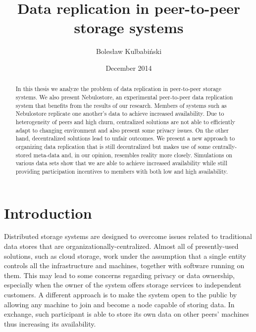 \documentclass{pracamgren}
\author{Bolesław Kulbabiński}
\title{Data replication in peer-to-peer storage systems}
\date{December 2014}
\begin{document}
 \maketitle

\begin{abstract} 
In this thesis we analyze the problem of data replication in peer-to-peer storage systems.
We also present Nebulostore, an experimental peer-to-peer data replication system that benefits from the results of our research.
Members of systems such as Nebulostore replicate one another's data to achieve increased availability. Due to heterogeneity of peers and high churn, centralized solutions are not able to efficiently adapt to changing environment and also present some privacy issues. On the other hand, decentralized solutions lead to unfair outcomes. We present a new approach to organizing data replication that is still decentralized but makes use of some centrally-stored meta-data and, in our opinion, resembles reality more closely. Simulations on various data sets show that we are able to achieve increased availability while still providing participation incentives to members with both low and high availability.
\end{abstract}


\tableofcontents


\chapter*{Introduction}\label{chap::introduction}

Distributed storage systems are designed to overcome issues related to traditional data stores that are organizationally-centralized.
Almost all of presently-used solutions, such as cloud storage, work under the assumption that a single entity controls all the infrastructure and machines, together with software running on them. This may lead to some concerns regarding privacy or data ownership, especially when the owner of the system offers storage services to independent customers.
A different approach is to make the system open to the public by allowing any machine to join and become a node capable of storing data. In exchange, such participant is able to store its own data on other peers' machines thus increasing its availability.\\
\end{document}
